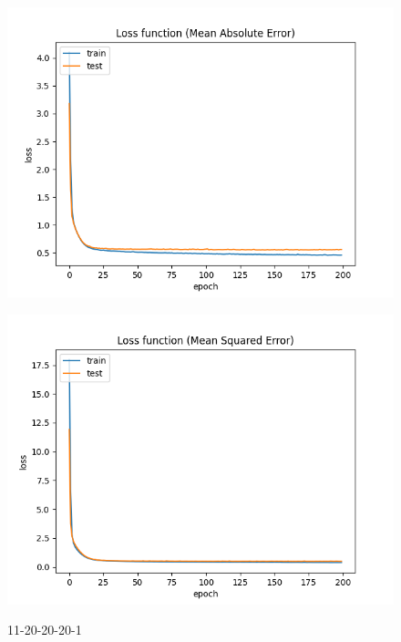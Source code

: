 \begin{figure}[!htb]
    \begin{minipage}{0.5\textwidth}
        \centering
        \includegraphics[width=01\textwidth]{../images/11-20-20-20/Loss function(Mean Absolute Error).png}
        \label{fig:11-20-20-20-1.1}
    \end{minipage}\hfill
    \begin{minipage}{0.5\textwidth}
        \centering
        \includegraphics[width=01\textwidth]{../images/11-20-20-20/Loss function(Mean Squared Error).png}
        \label{fig:11-20-20-20-1.1.2}
    \end{minipage}
    \caption{11-20-20-20-1}
\end{figure}

